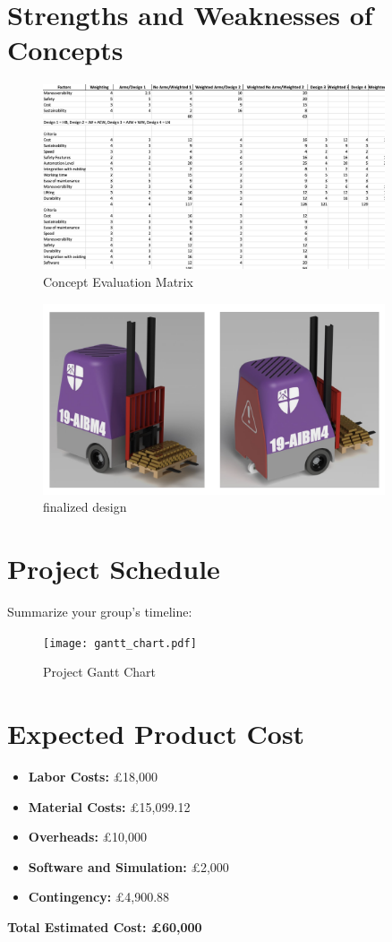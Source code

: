 \documentclass[12pt]{article}
\begin{document}
\section{Strengths and Weaknesses of Concepts}
\begin{figure}[h!]
    \centering
    \includegraphics[width=0.9\textwidth]{matrix.png}
    \caption{Concept Evaluation Matrix}
\end{figure}

\begin{figure}[h!]
    \centering
    \includegraphics[width=0.9\textwidth]{finaldesign.png}
    \caption{finalized design}
\end{figure}


\section{Project Schedule}
Summarize your group’s timeline:
\begin{figure}[h!]
    \centering
    \texttt{[image: gantt\_chart.pdf]}
    \caption{Project Gantt Chart}
\end{figure}

\newpage

\section{Expected Product Cost}
\begin{itemize}
    \item \textbf{Labor Costs:} £18,000
    \item \textbf{Material Costs:} £15,099.12
    \item \textbf{Overheads:} £10,000
    \item \textbf{Software and Simulation:} £2,000
    \item \textbf{Contingency:} £4,900.88
\end{itemize}
\textbf{Total Estimated Cost: £60,000}
\end{document}
